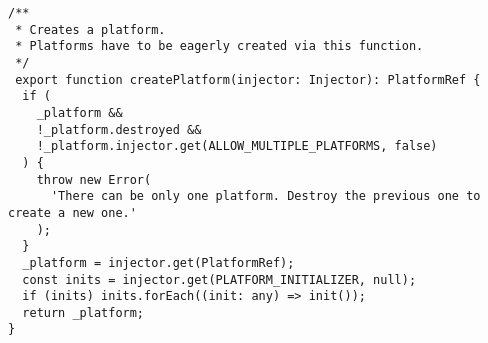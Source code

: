 \begin{verbatim}
/**
 * Creates a platform.
 * Platforms have to be eagerly created via this function.
 */
 export function createPlatform(injector: Injector): PlatformRef {
  if (
    _platform &&
    !_platform.destroyed &&
    !_platform.injector.get(ALLOW_MULTIPLE_PLATFORMS, false)
  ) {
    throw new Error(
      'There can be only one platform. Destroy the previous one to create a new one.'
    );
  }
  _platform = injector.get(PlatformRef);
  const inits = injector.get(PLATFORM_INITIALIZER, null);
  if (inits) inits.forEach((init: any) => init());
  return _platform;
}
\end{verbatim}
